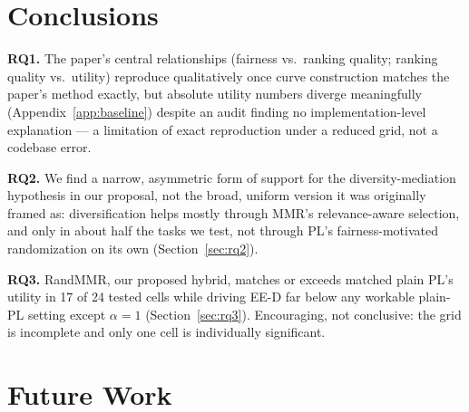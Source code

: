 \documentclass[10pt,twocolumn]{article}
\begin{document}
\section{Conclusions}
\label{sec:conclusion}

\textbf{RQ1.} The paper's central relationships (fairness vs.\ ranking quality;
ranking quality vs.\ utility) reproduce qualitatively once curve construction matches
the paper's method exactly, but absolute utility numbers diverge meaningfully
(Appendix~\ref{app:baseline}) despite an audit finding no implementation-level
explanation --- a limitation of exact reproduction under a reduced grid, not a
codebase error.

\textbf{RQ2.} We find a narrow, asymmetric form of support for the
diversity-mediation hypothesis in our proposal, not the broad, uniform version it was
originally framed as: diversification helps mostly through MMR's relevance-aware
selection, and only in about half the tasks we test, not through PL's
fairness-motivated randomization on its own (Section~\ref{sec:rq2}).

\textbf{RQ3.} RandMMR, our proposed hybrid, matches or exceeds matched plain PL's
utility in 17 of 24 tested cells while driving EE-D far below any workable plain-PL
setting except $\alpha{=}1$ (Section~\ref{sec:rq3}). Encouraging, not conclusive: the
grid is incomplete and only one cell is individually significant.

\section{Future Work}
\label{sec:future}
\end{document}
